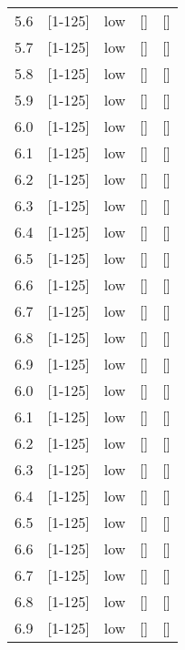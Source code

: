 \documentclass{article}
\begin{document}
\begin{tabular}{ l | l | l | l | l }
      5.6 & [1-125] & low & [] & [] &\\
      5.7 & [1-125] & low & [] & [] &\\
      5.8 & [1-125] & low & [] & [] &\\
      5.9 & [1-125] & low & [] & [] &\\
      6.0 & [1-125] & low & [] & [] &\\
      6.1 & [1-125] & low & [] & [] &\\
      6.2 & [1-125] & low & [] & [] &\\
      6.3 & [1-125] & low & [] & [] &\\
      6.4 & [1-125] & low & [] & [] &\\
      6.5 & [1-125] & low & [] & [] &\\
      6.6 & [1-125] & low & [] & [] &\\
      6.7 & [1-125] & low & [] & [] &\\
      6.8 & [1-125] & low & [] & [] &\\
      6.9 & [1-125] & low & [] & [] &\\
      6.0 & [1-125] & low & [] & [] &\\
      6.1 & [1-125] & low & [] & [] &\\
      6.2 & [1-125] & low & [] & [] &\\
      6.3 & [1-125] & low & [] & [] &\\
      6.4 & [1-125] & low & [] & [] &\\
      6.5 & [1-125] & low & [] & [] &\\
      6.6 & [1-125] & low & [] & [] &\\
      6.7 & [1-125] & low & [] & [] &\\
      6.8 & [1-125] & low & [] & [] &\\
      6.9 & [1-125] & low & [] & [] &\\
      \hline
    \end{tabular}
\end{document}
